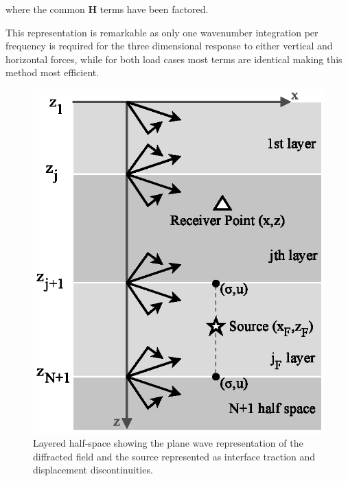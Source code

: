 \documentclass[preprint,5p,times]{elsarticle}
\begin{document}
where the common $\boldsymbol{H}$ terms have been factored.





This representation is remarkable as only one wavenumber integration per frequency is required for the three dimensional response to either vertical and horizontal forces, while for both load cases most terms are identical making this method most efficient.







\graphicspath{{./}}
\begin{figure}
	\centering
		\includegraphics{layeredandsource}
		\caption{Layered half-space showing the plane wave representation of the diffracted field and the source represented as interface traction and displacement discontinuities.}
		\label{figlayeredsoil}
\end{figure}
\end{document}
